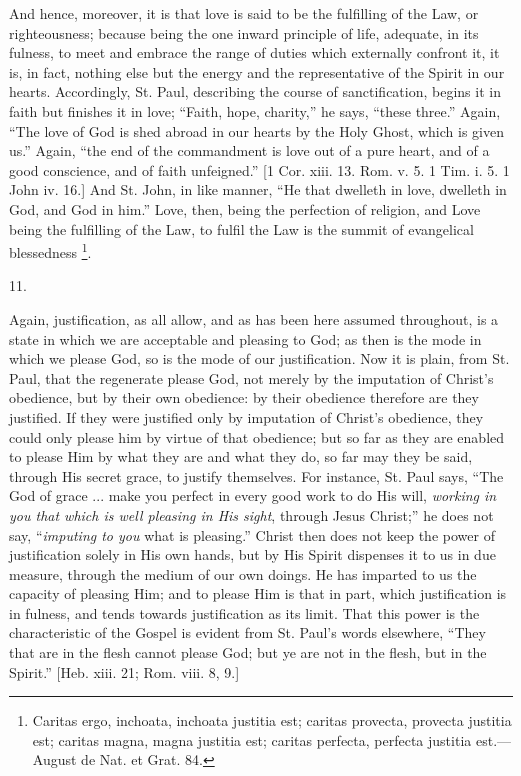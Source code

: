 And hence, moreover, it is that love is said to be the fulfilling
of the Law, or righteousness; because being the one inward principle
of life, adequate, in its fulness, to meet and embrace the range of
duties which externally confront it, it is, in fact, nothing else but
the energy and the representative of the Spirit in our hearts.
Accordingly, St. Paul, describing the course of sanctification, begins
it in faith but finishes it in love; ``Faith, hope, charity,''
he says, ``these three.'' Again, ``The love of God is shed
abroad in our hearts by the Holy Ghost, which is given us.''
Again, ``the end of the commandment is love out of a pure heart,
and of a good conscience, and of faith unfeigned.'' [1 Cor. xiii.
13. Rom. v. 5. 1 Tim. i. 5. 1 John iv. 16.] And St. John, in like
manner, ``He that dwelleth in love, dwelleth in God, and God in
him.'' Love, then, being the perfection of religion, and Love
being the fulfilling of the Law, to fulfil the Law is the summit of
evangelical blessedness \footnote{Caritas ergo,
inchoata, inchoata justitia est; caritas provecta, provecta justitia
est; caritas magna, magna justitia est; caritas perfecta, perfecta
justitia est.—August de Nat. et Grat. 84.}.

11.

Again, justification, as all allow, and as has been here assumed
throughout, is a state in which we are acceptable and pleasing to God;
as then is the mode in which we please God, so is the mode of our
justification. Now it is plain, from St. Paul, that the regenerate
please God, not merely by the imputation of Christ's obedience, but by
their own obedience: by their obedience therefore are they justified.
If they were justified only by imputation of Christ's obedience, they
could only please him by virtue of that obedience; but so far as they
are enabled to please Him by what they are and what they do, so far
may they be said, through His secret grace, to justify themselves. For
instance, St. Paul says, ``The God of grace ... make you perfect
in every good work to do His will, \emph{working in you that which is
well pleasing in His sight}, through Jesus Christ;'' he does
not say, ``\emph{imputing to you} what is pleasing.'' Christ
then does not keep the power of justification solely in His own hands,
but by His Spirit dispenses it to us in due measure, through the
medium of our own doings. He has imparted to us the capacity of
pleasing Him; and to please Him is that in part, which justification
is in fulness, and tends towards justification as its limit. That this
power is the characteristic of the Gospel is evident from St. Paul's
words elsewhere, ``They that are in the flesh cannot please God;
but ye are not in the flesh, but in the Spirit.'' [Heb. xiii. 21;
Rom. viii. 8, 9.]

